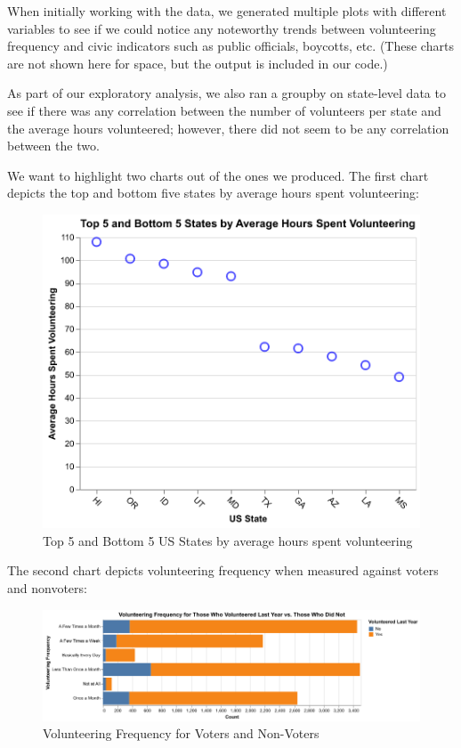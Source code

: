 \documentclass[
  letterpaper,
  DIV=11,
  numbers=noendperiod]{scrartcl}
\begin{document}
When initially working with the data, we generated multiple plots with
different variables to see if we could notice any noteworthy trends
between volunteering frequency and civic indicators such as public
officials, boycotts, etc. (These charts are not shown here for space,
but the output is included in our code.)

As part of our exploratory analysis, we also ran a groupby on
state-level data to see if there was any correlation between the number
of volunteers per state and the average hours volunteered; however,
there did not seem to be any correlation between the two.

We want to highlight two charts out of the ones we produced. The first
chart depicts the top and bottom five states by average hours spent
volunteering:

\begin{figure}[H]

{\centering \includegraphics{top_bottom_5_states_avg_volunteering.png}

}

\caption{Top 5 and Bottom 5 US States by average hours spent
volunteering}

\end{figure}%

The second chart depicts volunteering frequency when measured against
voters and nonvoters:

\begin{figure}[H]

{\centering \includegraphics{if_volunteered_last_year.png}

}

\caption{Volunteering Frequency for Voters and Non-Voters}

\end{figure}%
\end{document}
